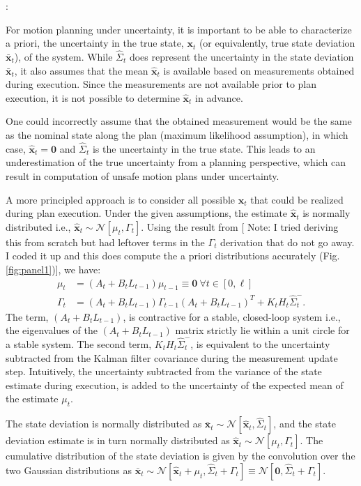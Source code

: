 \documentclass[letterpaper]{article}
\begin{document}
:

For motion planning under uncertainty, it is important to be able to characterize a priori, the uncertainty in the true state, $\mathbf{x}_t$ (or equivalently, true state deviation $\bar{\mathbf{x}}_t$), of the system. While $\hat{\Sigma}_t$ does represent the uncertainty in the state deviation $\bar{\mathbf{x}}_t$, it also assumes that the mean $\hat{\mathbf{x}}_t$ is available based on measurements obtained during execution. Since the measurements are not available prior to plan execution, it is not possible to determine $\hat{\mathbf{x}}_t$ in advance.

One could incorrectly assume that the obtained measurement would be the same as the nominal state along the plan (maximum likelihood assumption), in which case, $\hat{\mathbf{x}}_t = \mathbf{0}$ and $\hat{\Sigma}_t$ is the uncertainty in the true state. This leads to an underestimation of the true uncertainty from a planning perspective, which can result in computation of unsafe motion plans under uncertainty.

A more principled approach is to consider all possible $\hat{\mathbf{x}}_t$ that could be realized during plan execution. Under the given assumptions, the estimate $\hat{\mathbf{x}}_t$ is normally distributed i.e., $\hat{\mathbf{x}}_t \sim \mathcal{N}[\mu_t, \Gamma_t]$. Using the result from \cite{Bry11} [{\color{red} Note}: I tried deriving this from scratch but had leftover terms in the $\Gamma_t$ derivation that do not go away. I coded it up and this does compute the a priori distributions accurately (Fig. \ref{fig:panel1})], we have:
\begin{align*}
\mu_t &= (A_t + B_t L_{t-1})\mu_{t-1} \equiv \mathbf{0} ~ \forall t \in [0,\ell]\\
\Gamma_t &= (A_t + B_t L_{t-1}) \Gamma_{t-1} (A_t + B_t L_{t-1})^T + K_t H_t \hat{\Sigma}^{-}_{t}.
\end{align*}
The term, $(A_t + B_t L_{t-1})$, is contractive for a stable, closed-loop system i.e., the eigenvalues of the $(A_t + B_t L_{t-1})$ matrix strictly lie within a unit circle for a stable system. The second term, $K_t H_t \hat{\Sigma}^{-}_{t}$, is equivalent to the uncertainty subtracted from the Kalman filter covariance during the measurement update step. Intuitively, the uncertainty subtracted from the variance of the state estimate during execution, is added to the uncertainty of the expected mean of the estimate $\mu_t$.

The state deviation is normally distributed as $\bar{\mathbf{x}}_t \sim \mathcal{N}[\hat{\mathbf{x}}_t, \hat{\Sigma}_t]$, and the state deviation estimate is in turn normally distributed as $\hat{\mathbf{x}}_t \sim \mathcal{N}[\mu_t, \Gamma_t]$. The cumulative distribution of the state deviation is given by the convolution over the two Gaussian distributions as $\bar{\mathbf{x}}_t \sim \mathcal{N}[\hat{\mathbf{x}}_t + \mu_t, \hat{\Sigma}_t + \Gamma_t] \equiv \mathcal{N}[\mathbf{0}, \hat{\Sigma}_t + \Gamma_t]$.
\end{document}
